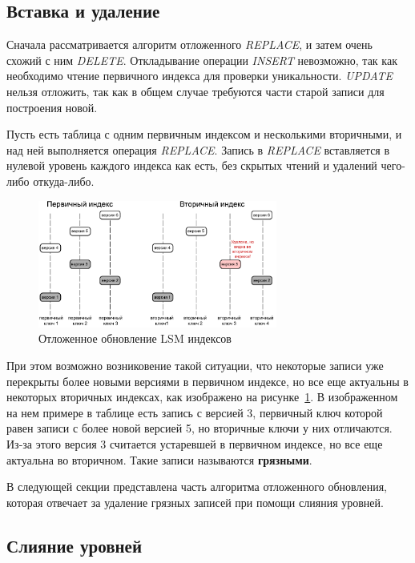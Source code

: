 \documentclass[a4paper,hidelinks,12pt]{article}
\begin{document}
\subsection{Вставка и удаление}
Сначала рассматривается алгоритм отложенного \textit{REPLACE}, и затем очень
схожий с ним \textit{DELETE}. Откладывание операции \textit{INSERT} невозможно,
так как необходимо чтение первичного индекса для проверки уникальности.
\textit{UPDATE} нельзя отложить, так как в общем случае требуются части старой
записи для построения новой.

Пусть есть таблица с одним первичным индексом и несколькими вторичными, и над
ней выполняется операция \textit{REPLACE}. Запись в \textit{REPLACE} вставляется
в нулевой уровень каждого индекса как есть, без скрытых чтений и удалений
чего-либо откуда-либо.

\begin{figure}
\centering
\includegraphics[width=0.7\textwidth]{table_after_deferred_update}
\caption{Отложенное обновление LSM индексов}
\label{fig:table_after_deferred_update}
\end{figure}

При этом возможно возниковение такой ситуации, что некоторые записи уже
перекрыты более новыми версиями в первичном индексе, но все еще актуальны в
некоторых вторичных индексах, как изображено на
рисунке~\ref{fig:table_after_deferred_update}. В изображенном на нем примере
в таблице есть запись с версией 3, первичный ключ которой равен записи с более
новой версией 5, но вторичные ключи у них отличаются. Из-за этого версия 3
считается устаревшей в первичном индексе, но все еще актуальна во вторичном.
Такие записи называются \textbf {грязными}.

В следующей секции представлена часть алгоритма отложенного обновления, которая
отвечает за удаление грязных записей при помощи слияния уровней.

\subsection{Слияние уровней}
\end{document}
